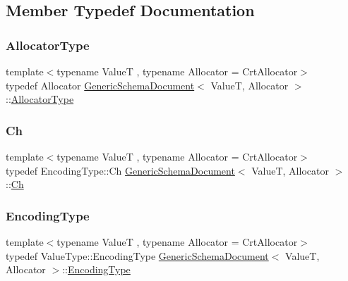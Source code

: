\subsection{Member Typedef Documentation}
\mbox{\label{classGenericSchemaDocument_ac0d88adf8c86917d8bc9563ffdab6a6d}} 
\subsubsection{\texorpdfstring{Allocator\+Type}{AllocatorType}}
{\footnotesize\ttfamily template$<$typename ValueT , typename Allocator  = Crt\+Allocator$>$ \\
typedef Allocator \hyperlink{classGenericSchemaDocument}{Generic\+Schema\+Document}$<$ ValueT, Allocator $>$\+::\hyperlink{classGenericSchemaDocument_ac0d88adf8c86917d8bc9563ffdab6a6d}{Allocator\+Type}}

\mbox{\label{classGenericSchemaDocument_ab1dec56a78b29649eb8e4b85b101ec7c}} 
\subsubsection{\texorpdfstring{Ch}{Ch}}
{\footnotesize\ttfamily template$<$typename ValueT , typename Allocator  = Crt\+Allocator$>$ \\
typedef Encoding\+Type\+::\+Ch \hyperlink{classGenericSchemaDocument}{Generic\+Schema\+Document}$<$ ValueT, Allocator $>$\+::\hyperlink{classGenericSchemaDocument_ab1dec56a78b29649eb8e4b85b101ec7c}{Ch}}

\mbox{\label{classGenericSchemaDocument_ad0293c28c9ffe80ab1f8ec86efee35c8}} 
\subsubsection{\texorpdfstring{Encoding\+Type}{EncodingType}}
{\footnotesize\ttfamily template$<$typename ValueT , typename Allocator  = Crt\+Allocator$>$ \\
typedef Value\+Type\+::\+Encoding\+Type \hyperlink{classGenericSchemaDocument}{Generic\+Schema\+Document}$<$ ValueT, Allocator $>$\+::\hyperlink{classGenericSchemaDocument_ad0293c28c9ffe80ab1f8ec86efee35c8}{Encoding\+Type}}

